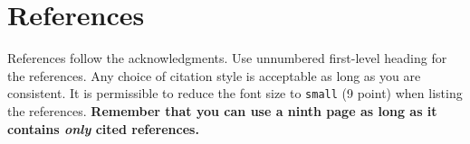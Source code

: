 \section*{References}

References follow the acknowledgments. Use unnumbered first-level
heading for the references. Any choice of citation style is acceptable
as long as you are consistent. It is permissible to reduce the font
size to \verb+small+ (9 point) when listing the references. {\bf
  Remember that you can use a ninth page as long as it contains
  \emph{only} cited references.}
 \medskip

\small
\nocite{NIPS1994_915,bower2012book,hasselmo1995dynamics}


